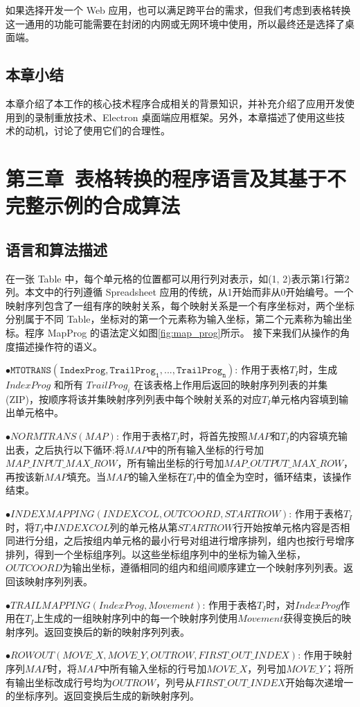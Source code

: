 \documentclass[design, pageheader]{njubachelor}
\begin{document}
如果选择开发一个 Web 应用，也可以满足跨平台的需求，但我们考虑到表格转换这一通用的功能可能需要在封闭的内网或无网环境中使用，所以最终还是选择了桌面端。

\subsection{本章小结}

本章介绍了本工作的核心技术程序合成相关的背景知识，并补充介绍了应用开发使用到的录制重放技术、Electron 桌面端应用框架。另外，本章描述了使用这些技术的动机，讨论了使用它们的合理性。

\section{第三章~表格转换的程序语言及其基于不完整示例的合成算法}
\subsection{语言和算法描述}
在一张 Table 中，每个单元格的位置都可以用行列对表示，如(1, 2)表示第1行第2列。本文中的行列遵循 Spreadsheet 应用的传统，从1开始而非从0开始编号。一个映射序列包含了一组有序的映射关系，每个映射关系是一个有序坐标对，两个坐标分别属于不同 Table，坐标对的第一个元素称为输入坐标，第二个元素称为输出坐标。程序 MapProg 的语法定义如图\ref{fig:map_prog}所示。 接下来我们从操作的角度描述操作符的语义。

\begin{ttmath}
$\bullet \mathtt{MTOTRANS(IndexProg,{TrailProg_{1},...,TrailProg_{n}})}$: 作用于表格$T_{I}$时，生成 $IndexProg$ 和所有 ${TrailProg_{i}}$ 在该表格上作用后返回的映射序列列表的并集(ZIP)，按顺序将该并集映射序列列表中每个映射关系的对应$T_{I}$单元格内容填到输出单元格中。

$\bullet NORMTRANS(MAP)$: 作用于表格$T_{I}$时，将首先按照$MAP$和$T_{I}$的内容填充输出表，之后执行以下循环:将$MAP$中的所有输入坐标的行号加$MAP\_INPUT\_MAX\_ROW$，所有输出坐标的行号加$MAP\_OUTPUT\_MAX\_ROW$，再按该新$MAP$填充。当$MAP$的输入坐标在$T_{I}$中的值全为空时，循环结束，该操作结束。

$\bullet INDEXMAPPING(INDEXCOL, OUTCOORD, STARTROW)$: 作用于表格$T_{I}$时，将$T_{I}$中$INDEXCOL$列的单元格从第$STARTROW$行开始按单元格内容是否相同进行分组，之后按组内单元格的最小行号对组进行增序排列，组内也按行号增序排列，得到一个坐标组序列。以这些坐标组序列中的坐标为输入坐标，$OUTCOORD$为输出坐标，遵循相同的组内和组间顺序建立一个映射序列列表。返回该映射序列列表。

$\bullet TRAILMAPPING(IndexProg, Movement)$: 作用于表格$T_{I}$时，对$IndexProg$作用在$T_{I}$上生成的一组映射序列中的每一个映射序列使用$Movement$获得变换后的映射序列。返回变换后的新的映射序列列表。

$\bullet ROWOUT(MOVE\_X, MOVE\_Y, OUTROW, FIRST\_OUT\_INDEX)$: 作用于映射序列$MAP$时，将$MAP$中所有输入坐标的行号加$MOVE\_X$，列号加$MOVE\_Y$；将所有输出坐标改成行号均为$OUTROW$，列号从$FIRST\_OUT\_INDEX$开始每次递增一的坐标序列。返回变换后生成的新映射序列。
\end{ttmath}
\end{document}
